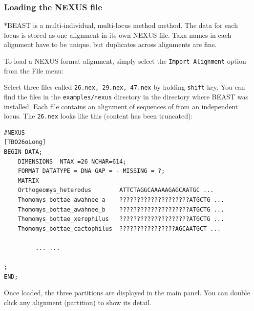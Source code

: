 \documentclass{article}
\begin{document}
\def\mlstname{*BEAST}

\subsubsection*{Loading the NEXUS file }

\mlstname{} is a multi-individual, multi-locus method method. The data for each
locus is stored as one alignment in its own NEXUS file. Taxa names in each
alignment have to be unique, but duplicates across alignments are fine.

To load a NEXUS format alignment, simply select the \texttt{Import
Alignment} option from the File menu: 

Select three files called \texttt{26.nex, 29.nex, 47.nex} by holding \texttt{shift} key. 
You can find the files in the {\tt examples/nexus} directory in the directory where BEAST was installed. 
Each file contains an alignment of sequences of from an independent locus. The \texttt{26.nex} looks like this (content has been truncated):

\begin{verbatim}
#NEXUS
[TBO26oLong]
BEGIN DATA;
	DIMENSIONS  NTAX =26 NCHAR=614;
	FORMAT DATATYPE = DNA GAP = - MISSING = ?;
	MATRIX	
	Orthogeomys_heterodus        ATTCTAGGCAAAAAGAGCAATGC ...
	Thomomys_bottae_awahnee_a    ????????????????????ATGCTG ...
	Thomomys_bottae_awahnee_b    ????????????????????ATGCTG ...
	Thomomys_bottae_xerophilus   ????????????????????ATGCTG ...
	Thomomys_bottae_cactophilus  ????????????????AGCAATGCT ...

         ... ...

;
END;
\end{verbatim}

\medskip{}

Once loaded, the three partitions are displayed in the main panel.
You can double click any alignment (partition) to show its detail.
\end{document}
